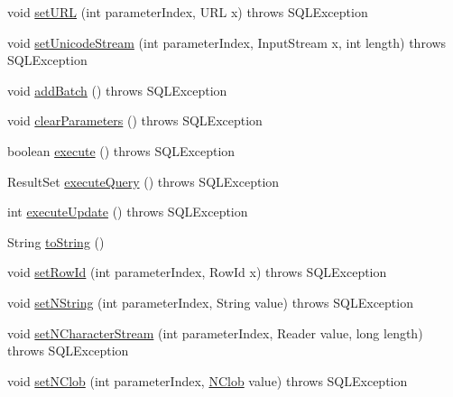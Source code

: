 \begin{DoxyCompactItemize}
\item 
void \mbox{\hyperlink{classcom_1_1mysql_1_1cj_1_1jdbc_1_1_prepared_statement_wrapper_a9c7bef05999b36c47458a609ffd48087}{set\+U\+RL}} (int parameter\+Index, U\+RL x)  throws S\+Q\+L\+Exception 
\item 
void \mbox{\hyperlink{classcom_1_1mysql_1_1cj_1_1jdbc_1_1_prepared_statement_wrapper_a6a935f5287914ce0489af2ca2118dbdc}{set\+Unicode\+Stream}} (int parameter\+Index, Input\+Stream x, int length)  throws S\+Q\+L\+Exception 
\item 
void \mbox{\hyperlink{classcom_1_1mysql_1_1cj_1_1jdbc_1_1_prepared_statement_wrapper_a489375b6557464827371090ab0f7f34d}{add\+Batch}} ()  throws S\+Q\+L\+Exception 
\item 
void \mbox{\hyperlink{classcom_1_1mysql_1_1cj_1_1jdbc_1_1_prepared_statement_wrapper_ae5a5f617a6b314ac5e53d703a9f44b5e}{clear\+Parameters}} ()  throws S\+Q\+L\+Exception 
\item 
boolean \mbox{\hyperlink{classcom_1_1mysql_1_1cj_1_1jdbc_1_1_prepared_statement_wrapper_a2e2560120c1aa47c46bec73c634c7654}{execute}} ()  throws S\+Q\+L\+Exception 
\item 
Result\+Set \mbox{\hyperlink{classcom_1_1mysql_1_1cj_1_1jdbc_1_1_prepared_statement_wrapper_ad8112a106cb0b21284bd0a3db7ad1699}{execute\+Query}} ()  throws S\+Q\+L\+Exception 
\item 
int \mbox{\hyperlink{classcom_1_1mysql_1_1cj_1_1jdbc_1_1_prepared_statement_wrapper_a0c47cb81a429c3495b9d1851e841cbad}{execute\+Update}} ()  throws S\+Q\+L\+Exception 
\item 
String \mbox{\hyperlink{classcom_1_1mysql_1_1cj_1_1jdbc_1_1_prepared_statement_wrapper_ad875cc9579cad123f5a2a60d140ef0f5}{to\+String}} ()
\item 
void \mbox{\hyperlink{classcom_1_1mysql_1_1cj_1_1jdbc_1_1_prepared_statement_wrapper_abd7a3f200e20f1fb2ae57651c14f12f7}{set\+Row\+Id}} (int parameter\+Index, Row\+Id x)  throws S\+Q\+L\+Exception 
\item 
void \mbox{\hyperlink{classcom_1_1mysql_1_1cj_1_1jdbc_1_1_prepared_statement_wrapper_aa93a1e7363dc07e810a65c76f459fd29}{set\+N\+String}} (int parameter\+Index, String value)  throws S\+Q\+L\+Exception 
\item 
void \mbox{\hyperlink{classcom_1_1mysql_1_1cj_1_1jdbc_1_1_prepared_statement_wrapper_aa438998eee938e02b383c9fac429b333}{set\+N\+Character\+Stream}} (int parameter\+Index, Reader value, long length)  throws S\+Q\+L\+Exception 
\item 
void \mbox{\hyperlink{classcom_1_1mysql_1_1cj_1_1jdbc_1_1_prepared_statement_wrapper_ab4a642b4327dbdb112d019dda77582fb}{set\+N\+Clob}} (int parameter\+Index, \mbox{\hyperlink{classcom_1_1mysql_1_1cj_1_1jdbc_1_1_n_clob}{N\+Clob}} value)  throws S\+Q\+L\+Exception 

\end{DoxyCompactItemize}
